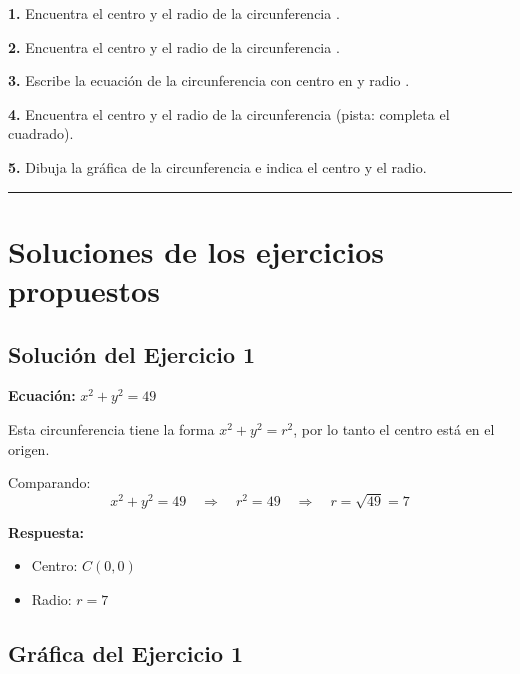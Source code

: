 \documentclass[12pt,a4paper]{article}
\begin{document}
	\textbf{1.} Encuentra el centro y el radio de la circunferencia {\color{red}{$x^2+y^2=49$}}.

	\bigskip

	\textbf{2.} Encuentra el centro y el radio de la circunferencia {\color{red}{$(x-4)^2+(y-1)^2=36$}}.

	\bigskip

	\textbf{3.} Escribe la ecuación de la circunferencia con centro en {\color{red}{$C(-2,5)$}} y radio {\color{red}{$r=6$}}.

	\bigskip

	\textbf{4.} Encuentra el centro y el radio de la circunferencia {\color{red}{$x^2+y^2+8x-10y+16=0$}} (pista: completa el cuadrado).

	\bigskip

	\textbf{5.} Dibuja la gráfica de la circunferencia {\color{red}{$(x+3)^2+(y-2)^2=25$}} e indica el centro y el radio.

	\bigskip
	\bigskip

	\hrule

	\bigskip
	\bigskip

	\section{Soluciones de los ejercicios propuestos}

	\subsection*{Solución del Ejercicio 1}

	\textbf{Ecuación:} $x^2+y^2=49$

	\bigskip

	Esta circunferencia tiene la forma $x^2+y^2=r^2$, por lo tanto el centro está en el origen.

	\bigskip

	Comparando:
	\[
	x^2+y^2=49 \quad\Rightarrow\quad r^2=49 \quad\Rightarrow\quad r=\sqrt{49}=7
	\]

	\textbf{Respuesta:}
	\begin{itemize}
		\item Centro: $\boxed{C(0,0)}$
		\item Radio: $\boxed{r=7}$
	\end{itemize}

	\subsection*{Gráfica del Ejercicio 1}
\end{document}
